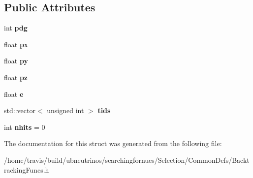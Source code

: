 \subsection*{Public Attributes}
\begin{DoxyCompactItemize}
\item 
int {\bfseries pdg}\hypertarget{structsearchingfornues_1_1BtPart_a4adfa8d6e2aab316bfda7d64d6cecb3e}{}\label{structsearchingfornues_1_1BtPart_a4adfa8d6e2aab316bfda7d64d6cecb3e}

\item 
float {\bfseries px}\hypertarget{structsearchingfornues_1_1BtPart_a3a0ddc2493391fd58b384792e0a1a5fd}{}\label{structsearchingfornues_1_1BtPart_a3a0ddc2493391fd58b384792e0a1a5fd}

\item 
float {\bfseries py}\hypertarget{structsearchingfornues_1_1BtPart_a7862a99921a6cdc435f401c4a7c70668}{}\label{structsearchingfornues_1_1BtPart_a7862a99921a6cdc435f401c4a7c70668}

\item 
float {\bfseries pz}\hypertarget{structsearchingfornues_1_1BtPart_ad65a32274c4b8b61a78739ed76080f3b}{}\label{structsearchingfornues_1_1BtPart_ad65a32274c4b8b61a78739ed76080f3b}

\item 
float {\bfseries e}\hypertarget{structsearchingfornues_1_1BtPart_a0037317972c950fac8188464838a9645}{}\label{structsearchingfornues_1_1BtPart_a0037317972c950fac8188464838a9645}

\item 
std\+::vector$<$ unsigned int $>$ {\bfseries tids}\hypertarget{structsearchingfornues_1_1BtPart_a0584d6c3edff2a6483d1fa94fd2d7a8c}{}\label{structsearchingfornues_1_1BtPart_a0584d6c3edff2a6483d1fa94fd2d7a8c}

\item 
int {\bfseries nhits} = 0\hypertarget{structsearchingfornues_1_1BtPart_a053f98b42289602fdeb9ca36e63fe0ee}{}\label{structsearchingfornues_1_1BtPart_a053f98b42289602fdeb9ca36e63fe0ee}

\end{DoxyCompactItemize}


The documentation for this struct was generated from the following file\+:\begin{DoxyCompactItemize}
\item 
/home/travis/build/ubneutrinos/searchingfornues/\+Selection/\+Common\+Defs/Backtracking\+Funcs.\+h\end{DoxyCompactItemize}
